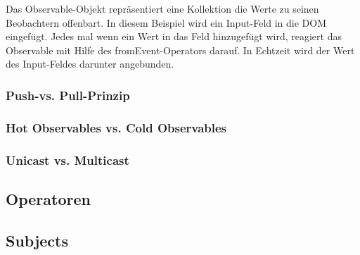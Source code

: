 \noindent
Das Observable-Objekt repräsentiert eine Kollektion die Werte zu seinen Beobachtern offenbart. In diesem Beispiel wird ein Input-Feld in die DOM eingefügt. Jedes mal wenn ein Wert in das Feld hinzugefügt wird, reagiert das Observable mit Hilfe des fromEvent-Operators darauf. In Echtzeit wird der Wert des Input-Feldes darunter angebunden.

\subsubsection{Push-vs. Pull-Prinzip}
\subsubsection{Hot Observables vs. Cold Observables}
\subsubsection{Unicast vs. Multicast}
\subsection{Operatoren}
\subsection{Subjects}









